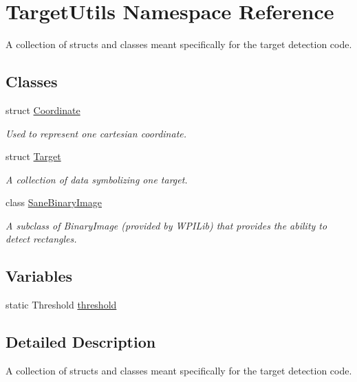 \hypertarget{namespace_target_utils}{\section{\-Target\-Utils \-Namespace \-Reference}
\label{namespace_target_utils}
}


\-A collection of structs and classes meant specifically for the target detection code.  


\subsection*{\-Classes}
\begin{DoxyCompactItemize}
\item 
struct \hyperlink{struct_target_utils_1_1_coordinate}{\-Coordinate}
\begin{DoxyCompactList}\small\item\em \-Used to represent one cartesian coordinate. \end{DoxyCompactList}\item 
struct \hyperlink{struct_target_utils_1_1_target}{\-Target}
\begin{DoxyCompactList}\small\item\em \-A collection of data symbolizing one target. \end{DoxyCompactList}\item 
class \hyperlink{class_target_utils_1_1_sane_binary_image}{\-Sane\-Binary\-Image}
\begin{DoxyCompactList}\small\item\em \-A subclass of \-Binary\-Image (provided by \-W\-P\-I\-Lib) that provides the ability to detect rectangles. \end{DoxyCompactList}\end{DoxyCompactItemize}
\subsection*{\-Variables}
\begin{DoxyCompactItemize}
\item 
static \-Threshold \hyperlink{namespace_target_utils_a947bbb5e94ef4920376ed9e3ba7349c6}{threshold}
\end{DoxyCompactItemize}


\subsection{\-Detailed \-Description}
\-A collection of structs and classes meant specifically for the target detection code. 

